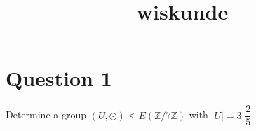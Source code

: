 \documentclass{article}
\title{wiskunde}
\begin{document}
\maketitle

\section*{Question 1}

Determine a group $(U, \odot) \leq E(\mathbb{Z}/7\mathbb{Z})$ with $\mid U\mid = 3$
$\dfrac{2}{5}$
\end{document}
